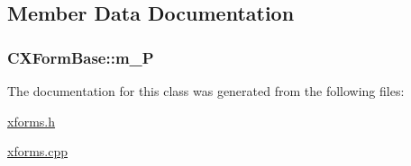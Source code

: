 \subsection{Member Data Documentation}
\hypertarget{classCXFormBase_a024b11a051eaf8d857bbc44c96a02e92}{
\subsubsection[{m\-\_\-\-P}]{ C\-X\-Form\-Base\-::m\-\_\-\-P\hspace{0.3cm}{\ttfamily [protected]}}}\label{classCXFormBase_a024b11a051eaf8d857bbc44c96a02e92}


The documentation for this class was generated from the following files\-:\begin{DoxyCompactItemize}
\item 
\hyperlink{xforms_8h}{xforms.\-h}\item 
\hyperlink{xforms_8cpp}{xforms.\-cpp}\end{DoxyCompactItemize}
